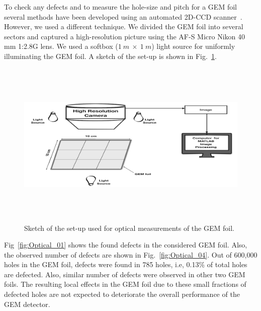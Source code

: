 To check any defects and to measure the hole-size and pitch for a GEM foil several methods have been developed using an automated 2D-CCD scanner~\cite{Posik2015, Becker2006}. 
However, we used a different technique.
We divided the GEM foil into several sectors and captured a high-resolution picture using the AF-S Micro Nikon 40 mm 1:2.8G lens.
We used a softbox ($1~m~\times~1~m$) light source for uniformly illuminating the GEM foil.
A sketch of the set-up is shown in Fig.~\ref{fig:Optical_Sketch}.
\begin{figure}[!htbp]
    \centering
        \includegraphics[width=12cm, height=8cm]{figures/GEM/figures/2.jpeg}
   \caption{Sketch of the set-up used for optical measurements of the GEM foil.}   \label{fig:Optical_Sketch}
\end{figure}
Fig~\ref{fig:Optical_01} shows the found defects in the considered GEM foil.
Also, the observed number of defects are shown in Fig.~\ref{fig:Optical_04}.
Out of 600,000 holes in the GEM foil, defects were found in 785 holes, i.e, 0.13\% of total holes are defected.
Also, similar number of defects were observed in other two GEM foils.
The resulting local effects in the GEM foil due to these small fractions of defected holes are not expected to deteriorate the overall performance of the GEM detector.
